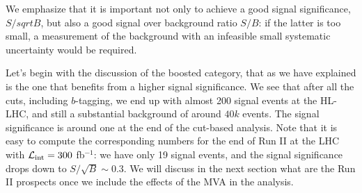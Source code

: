 We emphasize that it is important not only to achieve a good signal
significance, $S/sqrt{B}$, but also a good signal over background ratio $S/B$:
if the latter is too small, a measurement of the background with an infeasible small
systematic uncertainty would be required.

Let's begin with the discussion of the boosted category, that as we have explained
is the one that benefits from a higher signal significance.
%
We see that after all the cuts, including $b$-tagging,
we end up with almost 200 signal events at the HL-LHC, and
still a substantial background of around $40k$ events.
%
The signal significance is around one at the end of the
cut-based analysis.
%
Note that it is easy to compute the corresponding numbers
for the end of Run II at the LHC with
$\mathcal{L}_{\rm int}=300$ fb$^{-1}$: we have only
19 signal events, and the signal significance drops down to
$S/\sqrt{B}\sim 0.3$.
%
We will discuss in the next section what are the Run II prospects
once we include the effects of the MVA in the analysis.

